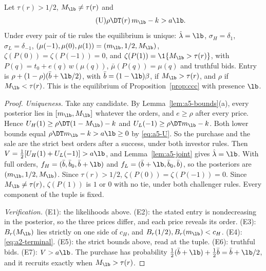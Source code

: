 \begin{lemma}\label{lem:a5-strong}
Let \(\tau(r)>1/2\), \(M_{\lb}\ne\tau(r)\) and
\begin{equation*}\tag{U}\label{eq:a5-U}
\rho\DT(r)\,m_{\lb}-k>a\lb .
\end{equation*}
Under every pair of tie rules the equilibrium is unique: \(\hat\lambda=\lb\), \(\sigma_H=\delta_1\),
\(\sigma_L=\delta_{-1}\), \((\mu(-1),\mu(0),\mu(1))=(m_{\lb},1/2,M_{\lb})\), \(\zeta(P(0))=\zeta(P(-1))=0\), and
\(\zeta(P(1))=\1\{M_{\lb}>\tau(r)\}\), with \(P(q)=t_0+e(q)\,w(\mu(q))\), \(\bar\mu(P(q))=\mu(q)\) and truthful bids.
Entry is \(\rho+(1-\rho)(\bar b+\lb/2)\), with \(\bar b=(1-\lb)\beta\), if \(M_{\lb}>\tau(r)\), and \(\rho\) if
\(M_{\lb}<\tau(r)\). This is the equilibrium of Proposition~\ref{prop:ccc} with presence \(\lb\).
\end{lemma}

\begin{proof}
\emph{Uniqueness.} Take any candidate. By Lemma~\ref{lem:a5-bounds}(a), every posterior lies in
\([m_{\lb},M_{\lb}]\) whatever the orders, and \(e\ge\rho\) after every price. Hence
\(U_H(1)\ge\rho\DT(1-M_{\lb})-k\) and \(U_L(-1)\ge\rho\DT m_{\lb}-k\). Both lower bounds equal
\(\rho\DT m_{\lb}-k>a\lb\ge0\) by \eqref{eq:a5-U}. So the purchase and the sale are the strict best orders after a
success, under both investor rules. Then \(V=\tfrac12[U_H(1)+U_L(-1)]>a\lb\), and Lemma~\ref{lem:a5-joint} gives
\(\hat\lambda=\lb\). With full orders, \(f_H=(\bar b,\bar b_0,\bar b+\lb)\) and \(f_L=(\bar b+\lb,\bar b_0,\bar b)\), so the
posteriors are \((m_{\lb},1/2,M_{\lb})\). Since \(\tau(r)>1/2\), \(\zeta(P(0))=\zeta(P(-1))=0\). Since
\(M_{\lb}\ne\tau(r)\), \(\zeta(P(1))\) is \(1\) or \(0\) with no tie, under both challenger rules. Every component of
the tuple is fixed.

\emph{Verification.} (E1): the likelihoods above. (E2): the stated entry is nondecreasing in the posterior, so the
three prices differ, and each price reveals its order. (E3): \(B_r(M_{\lb})\) lies strictly on one side of \(c_H\),
and \(B_r(1/2),B_r(m_{\lb})<c_H\). (E4): \eqref{eq:a2-terminal}. (E5): the strict bounds above, read at the tuple.
(E6): truthful bids. (E7): \(V>a\lb\). The purchase has probability \(\tfrac12(\bar b+\lb)+\tfrac12\bar b=\bar b+\lb/2\),
and it recruits exactly when \(M_{\lb}>\tau(r)\).
\end{proof}

